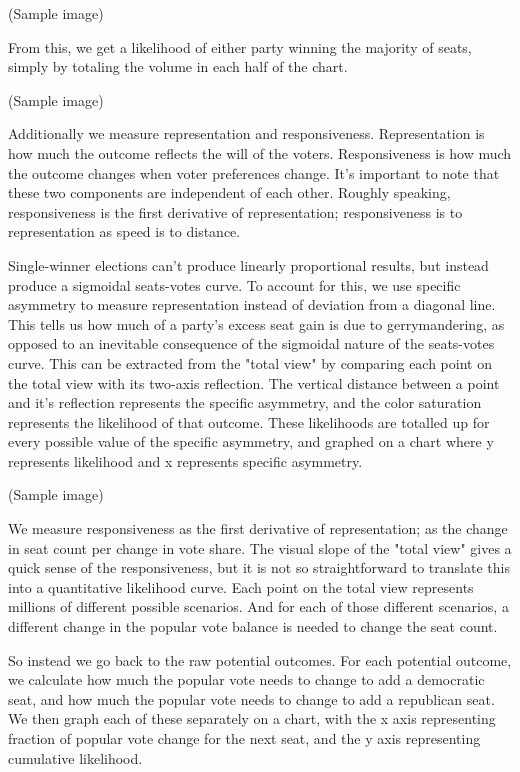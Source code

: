 \documentclass[preprint,12pt]{article}
\begin{document}
(Sample image)

From this, we get a likelihood of either party winning the majority of seats, simply by totaling the volume in each half of the chart. 

(Sample image)

Additionally we measure representation and responsiveness.  Representation is how much the outcome reflects the will of the voters.  Responsiveness is how much the outcome changes when voter preferences change.  It's important to note that these two components are independent of each other.  Roughly speaking, responsiveness is the first derivative of representation; responsiveness is to representation as speed is to distance.

Single-winner elections can't produce linearly proportional results, but instead produce a sigmoidal seats-votes curve.  To account for this, we use specific asymmetry to measure representation instead of deviation from a diagonal line.  This tells us how much of a party's excess seat gain is due to gerrymandering, as opposed to an inevitable consequence of  the sigmoidal nature of the seats-votes curve.  This can be extracted from the "total view" by comparing each point on the total view with its two-axis reflection.  The vertical distance between a point and it's reflection represents the specific asymmetry, and the color saturation represents the likelihood of that outcome.  These likelihoods are totalled up for every possible value of the specific asymmetry, and graphed on a chart where y represents likelihood and x represents specific asymmetry.

(Sample image)

We measure responsiveness as the first derivative of representation; as the change in seat count per change in vote share.   The visual slope of the "total view" gives a quick sense of the responsiveness, but it is not so straightforward to translate this into a quantitative likelihood curve.  Each point on the total view represents millions of different possible scenarios.  And for each of those different scenarios, a different change in the popular vote balance is needed to change the seat count. 

So instead we go back to the raw potential outcomes.  For each potential outcome, we calculate how much the popular vote needs to change to add a democratic seat, and how much the popular vote needs to change to add a republican seat.  We then graph each of these separately on a chart, with the x axis representing fraction of popular vote change for the next seat, and the y axis representing cumulative likelihood.
\end{document}
